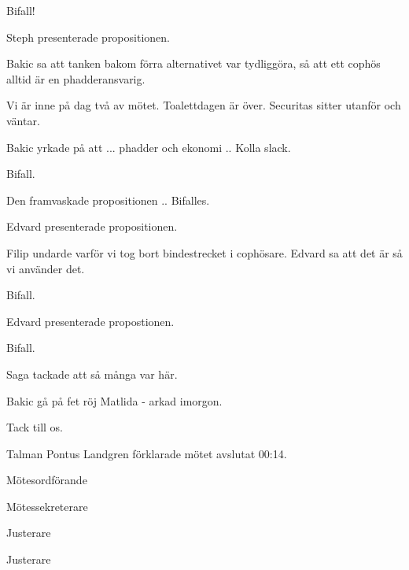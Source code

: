 \documentclass[10pt]{article}
\def\mo{Pontus Landgren}
\def\ms{Mattias Landgren}
\def\ji{}
\def\jii{}
\begin{document}
\begin{paragrafer}
\begin{paragrafer}
      Bifall!

      Steph presenterade propositionen. 

      Bakic sa att tanken bakom förra alternativet var tydliggöra, så att ett cophös alltid är en phadderansvarig. 

      Vi är inne på dag två av mötet. Toalettdagen är över. Securitas sitter utanför och väntar. 

      Bakic yrkade på att ... phadder och ekonomi .. Kolla slack. 

      Bifall.

      Den framvaskade propositionen .. Bifalles. 

  


      Edvard presenterade propositionen. 

      Filip undarde varför vi tog bort bindestrecket i cophösare. Edvard sa att det är så vi använder det. 

      Bifall.


      Edvard presenterade propostionen. 

      Bifall.
      
    \end{paragrafer}
Saga tackade att så många var här. 

Bakic gå på fet röj
Matlida - arkad imorgon. 

Tack till os. 

Talman {\mo} förklarade mötet avslutat 00:14.

\end{paragrafer}


%


\hidesignfoot
\begin{signatures}{4}
\signature{\mo}{Mötesordförande}
\signature{\ms}{Mötessekreterare}
\signature{\ji}{Justerare}
\signature{\jii}{Justerare}
\end{signatures}
\end{document}
